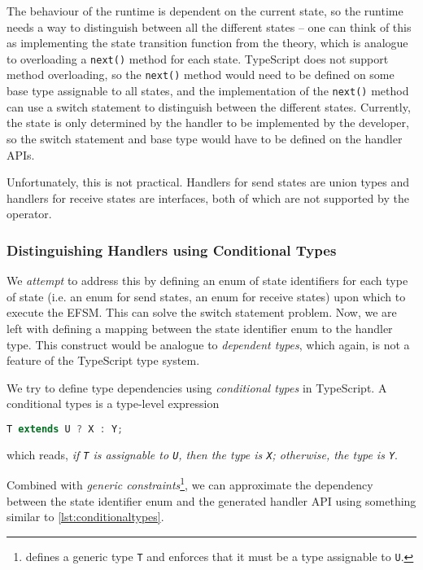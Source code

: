 The behaviour of the runtime is dependent on the current state,
so the runtime needs a way to distinguish between
all the different states -- one can think of this as implementing
the state transition function from the theory, which is analogue to 
overloading a \texttt{next()} method for each state.
TypeScript does not support method overloading,
so the \texttt{next()} method would need to be defined
on some base type assignable to all states,
and the implementation of the \texttt{next()} method 
can use a switch statement to distinguish between the different states.
Currently, the state is only determined by the handler
to be implemented by the developer, so the switch statement
and base type would have to be defined on the handler APIs.

Unfortunately, this is not practical. 
Handlers for send states are union types and
handlers for receive states are interfaces,
both of which are not supported 
by the 
operator.

\subsubsection{Distinguishing Handlers using Conditional Types}
\label{subsubsection:dependenttypes}

We \textit{attempt} to address this by defining an enum of state identifiers
for each type of state (i.e. an enum for send states, 
an enum for receive states)
upon which to execute the EFSM. 
This can solve the switch statement problem.
Now, we are left with defining a mapping between the 
state identifier enum to the handler type. This construct would be
analogue to \textit{dependent types}, which again, is not a feature
of the TypeScript type system.

We try to define type dependencies using
\textit{conditional types} in TypeScript.
A conditional types is a type-level expression
\begin{lstlisting}[language=javascript,numbers=none]
T extends U ? X : Y;
\end{lstlisting}
which reads, \textit{if \texttt{T} is assignable to \texttt{U},
then the type is \texttt{X}; otherwise, the type is \texttt{Y}}.

Combined with \textit{generic constraints}\footnote{
 defines a generic type \texttt{T}
and enforces that it must be a type assignable to \texttt{U}.
},
we can approximate the dependency between the state identifier
enum and the generated handler API using something
similar to \cref{lst:conditionaltypes}.

